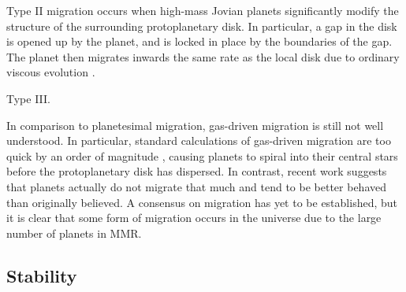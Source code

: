 \documentclass[12pt,letter]{aastex}
\begin{document}
Type II migration occurs when high-mass Jovian planets significantly modify the structure of the surrounding protoplanetary disk. 
In particular, a gap in the disk is opened up by the planet, and is locked in place by the boundaries of the gap.
The planet then migrates inwards the same rate as the local disk due to ordinary viscous evolution \citep{Armitage2010}.  

Type III. 

In comparison to planetesimal migration, gas-driven migration is still not well understood. 
In particular, standard calculations of gas-driven migration are too quick by an order of magnitude \citep{Lin1986, Tanaka2002}, causing planets to spiral into their central stars before the protoplanetary disk has dispersed.
In contrast, recent work \citep{Fung2017} suggests that planets actually do not migrate that much and tend to be better behaved than originally believed. 
A consensus on migration has yet to be established, but it is clear that some form of migration occurs in the universe due to the large number of planets in MMR.

\subsection{Stability}



\end{document}

